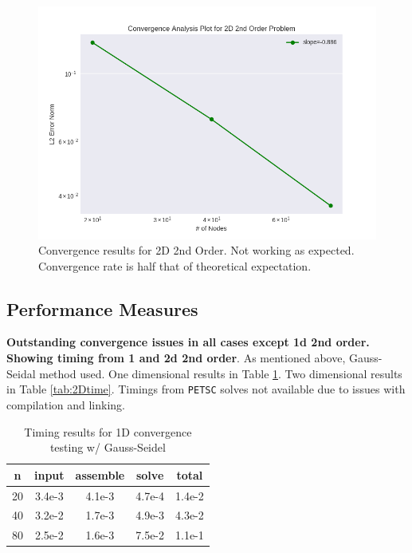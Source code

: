 \documentclass[letterpaper,12pt]{article}
\begin{document}
\begin{figure}[h]
\centering
\label{fig:2d2nd}
\includegraphics[width=1 \textwidth]{2d2nd.PNG}
\caption{Convergence results for 2D 2nd Order. Not working as expected. Convergence rate is half that of theoretical expectation.}
\end{figure}

\subsection{Performance Measures}
\textbf{Outstanding convergence issues in all cases except 1d 2nd order. Showing timing from 1 and 2d 2nd order}. As mentioned above, Gauss-Seidal method used. One dimensional results in Table \ref{tab:1Dtime}. Two dimensional results in Table \ref{tab:2Dtime}. Timings from \verb|PETSC| solves not available due to issues with compilation and linking.

\begin{table}[h]
\label{tab:1Dtime}
\caption{Timing results for 1D convergence testing w/ Gauss-Seidel}
\begin{center}
\begin{tabular}{| c | c | c | c || c |}
\hline
n &input &assemble &solve & total \\ \hline \hline
 20 &3.4e-3 &4.1e-3 &4.7e-4 & 1.4e-2\\ \hline
 40 &3.2e-2 &1.7e-3 &4.9e-3 & 4.3e-2\\ \hline
 80 &2.5e-2 &1.6e-3 &7.5e-2 & 1.1e-1\\ \hline
\end{tabular}
\end{center}
\end{table}
\end{document}
